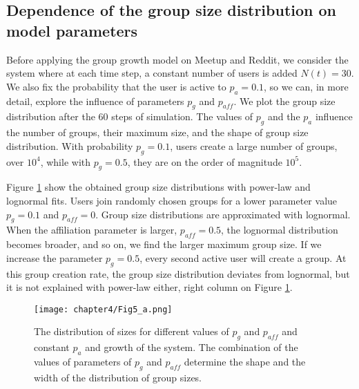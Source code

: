 \subsection{Dependence of the group size distribution on model parameters}

Before applying the group growth model on Meetup and Reddit, we consider the system where at each time step, a constant number of users is added $N(t)=30$. We also fix the probability that the user is active to $p_a=0.1$, so we can, in more detail, explore the influence of parameters $p_g$ and $p_{aff}$. We plot the group size distribution after the $60$ steps of simulation. The values of $p_g$ and the $p_a$ influence the number of groups, their maximum size, and the shape of group size distribution. With probability $p_g=0.1$, users create a large number of groups, over $10^4$, while with $p_g=0.5$, they are on the order of magnitude $10^5$. 

Figure \ref{fig:n30} show the obtained group size distributions with power-law and lognormal fits. Users join randomly chosen groups for a lower parameter value $p_g=0.1$ and $p_{aff}=0$. Group size distributions are approximated with lognormal. When the affiliation parameter is larger, $p_{aff}=0.5$, the lognormal distribution becomes broader, and so on, we find the larger maximum group size. If we increase the parameter $p_g=0.5$, every second active user will create a group. At this group creation rate, the group size distribution deviates from lognormal, but it is not explained with power-law either, right column on Figure \ref{fig:n30}.

\begin{figure}[H]
	\centering
	\texttt{[image: chapter4/Fig5\_a.png]}
	\caption[Group size distribution for different model parameters.]{The distribution of sizes for different values of $p_{g}$ and $p_{aff}$ and constant $p_{a}$ and growth of the system. The combination of the values of parameters of $p_{g}$ and $p_{aff}$ determine the shape and the width of the distribution of group sizes. }
	\label{fig:n30}
\end{figure}

